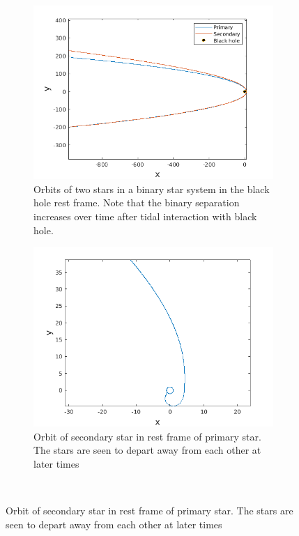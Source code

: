 \documentclass[a4paper]{article}
\begin{document}
\begin{enumerate} [label*=\textbf{(\alph*)}]
					\begin{figure}
						\begin{subfigure} {.5\columnwidth}
							\includegraphics[width=\columnwidth]{../plots/3d_orbitsdisruption_equalaxes.png}
							\caption{Orbits of two stars in a binary star system in the black hole rest frame. Note that the binary separation increases over time after tidal interaction with black hole.}
							\label{fig:3da}
						\end{subfigure}
						\hfill
						\begin{subfigure} {.5\columnwidth}
							\includegraphics[width=\columnwidth]{../plots/3d_secondaryorbitdisruption_equalaxes.png}
							\caption{Orbit of secondary star in rest frame of primary star. The stars are seen to depart away from each other at later times}
							\label{fig:3db}
						\end{subfigure}\\
						

\end{figure}
\end{enumerate}
\end{document}
